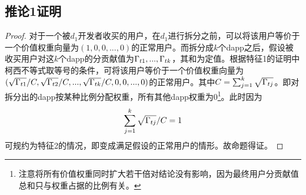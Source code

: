 \subsection{推论1证明}
\begin{proof}
	对于一个被$d_1$开发者收买的用户，在$d_1$进行拆分之前，可以将该用户等价于一个价值权重向量为$(1,0,0,...,0)$的正常用户。而拆分成$k$个dapp之后，假设被收买用户对这$k$个dapp的分贡献值为$\Gamma_{t1},...,\Gamma_{tk}$，其和为定值。根据特征1的证明中柯西不等式取等号的条件，可将该用户等价于一个价值权重向量为$(\sqrt{\Gamma_{t1}}/C,\sqrt{\Gamma_{t2}}/C,...,\sqrt{\Gamma_{tk}}/C,0,0,...,0)$的正常用户。其中$C=\sum_{j=1}^k \sqrt{\Gamma_{tj}}$。即对拆分出的dapp按某种比例分配权重，所有其他dapp权重为0\footnote{注意将所有价值权重同时扩大若干倍对结论没有影响，因为最终用户分贡献值总和只与权重占据的比例有关。}。此时因为
	$$\sum_{j=1}^k \sqrt{\Gamma_{tj}}/C =1$$
	可规约为特征2的情况，即变成满足假设的正常用户的情形。故命题得证。
\end{proof}

